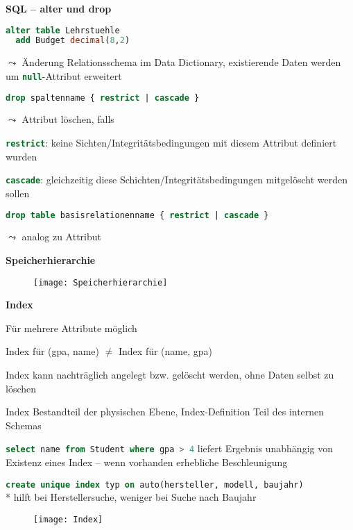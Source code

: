 \textbf{SQL -- alter und drop}
\begin{items}
	\item \begin{lstlisting}[language=sql]
alter table Lehrstuehle
  add Budget decimal(8,2)
\end{lstlisting}
	\item \( \leadsto \) Änderung Relationsschema im Data Dictionary, existierende Daten werden um \lstinline[language=sql]{null}-Attribut erweitert
	\item \begin{lstlisting}[language=sql]
drop spaltenname { restrict | cascade }
\end{lstlisting}
\item \( \leadsto \) Attribut löschen, falls
\begin{enumeration}
	\item \lstinline[language=sql]{restrict}: keine Sichten/Integritätsbedingungen mit diesem Attribut definiert wurden
	\item \lstinline[language=sql]{cascade}: gleichzeitig diese Schichten/Integritätsbedingungen mitgelöscht werden sollen
\end{enumeration}
\item \begin{lstlisting}[language=sql]
drop table basisrelationenname { restrict | cascade }
\end{lstlisting}
\item \( \leadsto \) analog zu Attribut
\end{items}

\textbf{Speicherhierarchie}
\begin{figure}[H]\centering\label{Speicherhierarchie}\texttt{[image: Speicherhierarchie]}\end{figure}

\textbf{Index}
\begin{items}
	\item Für mehrere Attribute möglich
	\item Index für (gpa, name) \( \neq \) Index für (name, gpa)
	\item Index kann nachträglich angelegt bzw. gelöscht werden, ohne Daten selbst zu löschen
	\item Index Bestandteil der physischen Ebene, Index-Definition Teil des internen Schemas
	\item \lstinline[language=sql]{select name from Student where gpa > 4} liefert Ergebnis unabhängig von Existenz eines Index -- wenn vorhanden erhebliche Beschleunigung
	\item \lstinline[language=sql]{create unique index typ on auto(hersteller, modell, baujahr)} \\* hilft bei Herstellersuche, weniger bei Suche nach Baujahr
\end{items}
\begin{figure}[H]\centering\label{Index}\texttt{[image: Index]}\end{figure}

